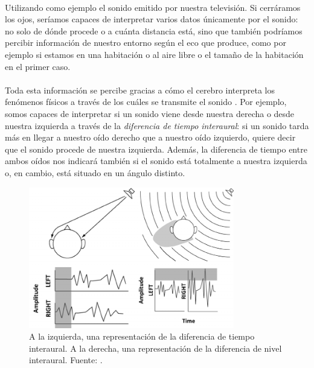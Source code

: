 \documentclass{subfiles}
\begin{document}
        \paragraph{}
        Utilizando como ejemplo el sonido emitido por nuestra televisión. Si cerráramos los ojos, seríamos capaces de interpretar varios datos únicamente por el sonido: no solo de dónde procede o a cuánta distancia está, sino que también podríamos percibir información de nuestro entorno según el eco que produce, como por ejemplo si estamos en una habitación o al aire libre o el tamaño de la habitación en el primer caso.

        \paragraph{}
        Toda esta información se percibe gracias a cómo el cerebro interpreta los fenómenos físicos a través de los cuáles se transmite el sonido \cite{web:resonance_audio_localizacion_sonido, web:wikipedia_localizacion_sonido}. Por ejemplo, somos capaces de interpretar si un sonido viene desde nuestra derecha o desde nuestra izquierda a través de la \textit{diferencia de tiempo interaural}: si un sonido tarda más en llegar a nuestro oído derecho que a nuestro oído izquierdo, quiere decir que el sonido procede de nuestra izquierda. Además, la diferencia de tiempo entre ambos oídos nos indicará también si el sonido está totalmente a nuestra izquierda o, en cambio, está situado en un ángulo distinto.

        \begin{figure}
        \centering
        \includegraphics[width=0.8\textwidth]{img/ITD_ILD.png}
        \caption{A la izquierda, una representación de la diferencia de tiempo interaural. A la derecha, una representación de la diferencia de nivel interaural. Fuente: .}
        \label{fig:ITD_ILD}
        \end{figure}
\end{document}

